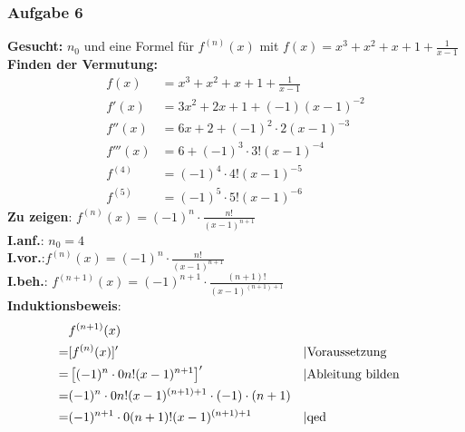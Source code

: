 \subsubsection{Aufgabe 6}
\textbf{Gesucht:} $n_0$  und eine Formel für $ f^{(n)}(x) $ mit $ f(x)=x^3+x^2+x+1+\frac{1}{x-1}$ \\
\textbf{Finden der Vermutung:}\begin{align*}
f(x)		&= x^3+x^2+x+1+\frac{1}{x-1}\\
f'(x)		&= 3x^2+2x+1+(-1)(x-1)^{-2}\\
f''(x)	&= 6x+2+(-1)^2\cdot2(x-1)^{-3}\\
f'''(x)	&= 6+(-1)^3\cdot3!(x-1)^{-4}\\
f^{(4)}	&= (-1)^4\cdot4!(x-1)^{-5}\\
f^{(5)}	&= (-1)^5\cdot5!(x-1)^{-6}\end{align*}
\textbf{Zu zeigen}: $ f^{(n)}(x) = (-1)^n \cdot \frac{n!}{(x-1)^{n+1}} $\\
\textbf{I.anf.}: $ n_0 = 4 $\\
\textbf{I.vor.}:$ f^{(n)}(x) = (-1)^n \cdot \frac{n!}{(x-1)^{n+1}} $\\
\textbf{I.beh.}: $ f^{(n+1)}(x) = (-1)^{n+1} \cdot \frac{(n+1)!}{(x-1)^{(n+1)+1}} $\\
\textbf{Induktionsbeweis}:\begin{align*}
&f^{(n+1)}(x) \\= &[f^{(n)}(x)]' && \text{\textbar Voraussetzung}\\
						= &\left[ (-1)^n \cdot \frac{n!}{(x-1)^{n+1}} \right]' && \text{\textbar Ableitung bilden}\\
						= &(-1)^n \cdot \frac{n!}{(x-1)^{(n+1)+1}} \cdot (-1) \cdot (n+1) \\
						= &(-1)^{n+1} \cdot \frac{(n+1)!}{(x-1)^{(n+1)+1}} && \text{\textbar qed}\end{align*}

